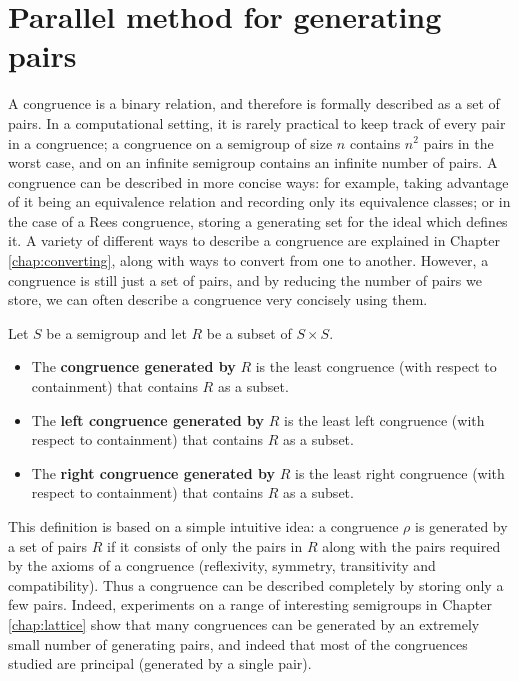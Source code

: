 \chapter{Parallel method for generating pairs}
\label{chap:pairs}

A congruence is a binary relation, and therefore is formally described as a set
of pairs.  In a computational setting, it is rarely practical to keep track of
every pair in a congruence; a congruence on a semigroup of size $n$ contains
$n^2$ pairs in the worst case, and on an infinite semigroup contains an infinite
number of pairs.  A congruence can be described in more concise ways:
for example, taking advantage of it being an equivalence relation
and recording only its equivalence classes; or in the case of a Rees congruence,
storing a generating set for the ideal which defines it.  A variety of different
ways to describe a congruence are explained in Chapter \ref{chap:converting},
along with ways to convert from one to another.  However, a congruence is still just
a set of pairs, and by reducing the number of pairs we store, we can often describe a
congruence very concisely using them.

\begin{definition}
  Let $S$ be a semigroup and let $R$ be a subset of $S \times S$.
  \begin{itemize}
  \item
    The \textbf{congruence generated by} $R$ is the least congruence
    (with respect to containment) that contains $R$ as a subset.
  \item
    The \textbf{left congruence generated by} $R$ is the least left congruence
    (with respect to containment) that contains $R$ as a subset.
  \item
    The \textbf{right congruence generated by} $R$ is the least right congruence
    (with respect to containment) that contains $R$ as a subset.
  \end{itemize}
\end{definition}

This definition is based on a simple intuitive idea:
a congruence $\rho$ is generated by a set of pairs $R$ if it consists
of only the pairs in $R$ along with the pairs required by the axioms of a
congruence (reflexivity, symmetry, transitivity and compatibility).  Thus a
congruence can be described completely by storing only a few pairs.
Indeed, experiments on a range of interesting semigroups in Chapter
\ref{chap:lattice} show that many congruences can be generated by an extremely
small number of generating pairs, and indeed that most of the congruences
studied are principal (generated by a single pair). %

